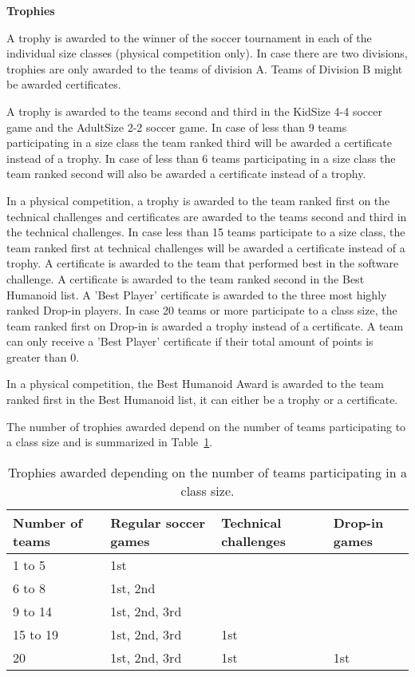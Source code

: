 \bigskip

{\bfseries Trophies}

\headlinebox

A trophy is awarded to the winner of the soccer tournament in each of the
individual size classes
(physical competition only).
In case there are two divisions, trophies are only awarded to the teams
of division A. Teams of Division B might be awarded certificates.


\bigskip

A trophy is awarded to the teams second and third in the KidSize 4-4 soccer game
and the AdultSize 2-2 soccer game.
In case of less than 9 teams participating in a size class the team ranked third
will be awarded a certificate instead of a trophy.
In case of less than 6 teams participating in a size class the team ranked
second will also be awarded a certificate instead of a trophy.

\bigskip

In a physical competition, a trophy is awarded to the team ranked first
on the technical challenges and certificates are awarded to the teams second
and third in the technical challenges.
In case less than 15 teams participate to a size class, the team ranked
first at technical challenges will be awarded a certificate instead of a trophy.
A certificate is awarded to the team that performed best in the software challenge.
A certificate is awarded to the team ranked second in the Best Humanoid list.
A 'Best Player' certificate is awarded to the three most highly ranked
Drop-in players.
In case 20 teams or more participate to a class size, the team ranked first on
Drop-in is awarded a trophy instead of a certificate.
A team can only receive a 'Best Player' certificate if their total amount of
points is greater than 0.

\bigskip

In a physical competition, the Best Humanoid Award is awarded to the team ranked first in the Best Humanoid list,
it can either be a trophy or a certificate.

\bigskip


  The number of trophies awarded depend on the number of teams participating to
  a class size and is summarized in Table~\ref{tab:trophies}.


\begin{table}
  \centering
  \begin{tabular}{llll}
    Number of teams & Regular soccer games & Technical challenges & Drop-in games\\
    \hline
    1 to 5 & 1st & & \\
    6 to 8 & 1st, 2nd & & \\
    9 to 14 & 1st, 2nd, 3rd & & \\
    15 to 19 & 1st, 2nd, 3rd & 1st & \\
    20 & 1st, 2nd, 3rd & 1st & 1st \\
  \end{tabular}
  \caption{Trophies awarded depending on the number of teams participating
  in a class size.}
  \label{tab:trophies}
\end{table}

